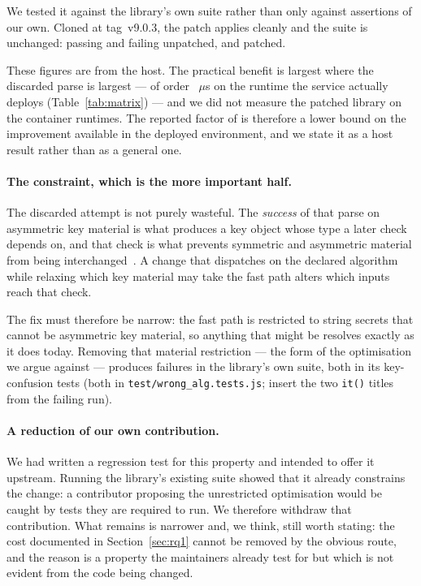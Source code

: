 \documentclass[pdflatex,sn-basic,twocolumn]{sn-jnl}%
\newif\ifshowauthornotes
\newcommand{\TODO}[1]{\ifshowauthornotes\textcolor{notered}{\textbf{#1}}\else#1\fi}
\newcommand{\LibraryTag}{\TODO{tag~v9.0.3}}
\newcommand{\NaiveFailingTests}{\TODO{both in \texttt{test/wrong\_alg.tests.js}; insert the two \texttt{it()} titles from the failing run}}
\begin{document}
We tested it against the library's own suite rather than only against assertions
of our own. Cloned at \LibraryTag, the patch applies cleanly and the suite is
unchanged: \SuiteStockPassing{} passing and \SuiteStockFailing{} failing
unpatched, \SuitePatchedPassing{} and \SuitePatchedFailing{} patched.

These figures are from the host. The practical benefit is largest where the
discarded parse is largest --- of order \NodeEighteenProbeThrows~$\mu$s on the
runtime the service actually deploys (Table~\ref{tab:matrix}) --- and we did not
measure the patched library on the container runtimes. The reported factor of
\HostSafePatchRatio{} is therefore a lower bound on the improvement available in
the deployed environment, and we state it as a host result rather than as a
general one.

\paragraph{The constraint, which is the more important half.} The discarded
attempt is not purely wasteful. The \emph{success} of that parse on asymmetric
key material is what produces a key object whose type a later check depends on,
and that check is what prevents symmetric and asymmetric material from being
interchanged~\cite{rfc8725}. A change that dispatches on the declared algorithm
while relaxing which key material may take the fast path alters which inputs
reach that check.

The fix must therefore be narrow: the fast path is restricted to string secrets
that cannot be asymmetric key material, so anything that might be resolves
exactly as it does today. Removing that material restriction --- the form of the
optimisation we argue against --- produces \SuiteNaiveFailing{} failures in the
library's own suite, both in its key-confusion tests
(\NaiveFailingTests).

\paragraph{A reduction of our own contribution.} We had written a regression test
for this property and intended to offer it upstream. Running the library's
existing suite showed that it already constrains the change: a contributor
proposing the unrestricted optimisation would be caught by tests they are
required to run. We therefore withdraw that contribution. What remains is
narrower and, we think, still worth stating: the cost documented in
Section~\ref{sec:rq1} cannot be removed by the obvious route, and the reason is a
property the maintainers already test for but which is not evident from the code
being changed.
\end{document}
